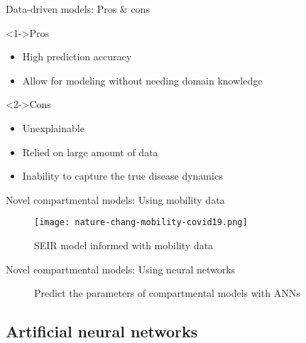 \begin{frame}{Data-driven models: Pros \& cons}
    \begin{exampleblock}<1->{Pros}
    \begin{itemize}
        \item High prediction accuracy
        \item Allow for modeling without needing domain knowledge
    \end{itemize}
    \end{exampleblock}

    \begin{alertblock}<2->{Cons}
    \begin{itemize}
        \item Unexplainable
        \item Relied on large amount of data
        \item Inability to capture the true disease dynamics
    \end{itemize}
    \end{alertblock}
\end{frame}

\begin{frame}{Novel compartmental models: Using mobility data}
    \begin{figure}[!htb]
        \centering
        \texttt{[image: nature-chang-mobility-covid19.png]}
        \caption{\gls{SEIR} model informed with mobility data \cite{changMobilityNetworkModels2021}}
        \label{fig:nature-chang-mobility-covid19}
    \end{figure}
\end{frame}

\begin{frame}{Novel compartmental models: Using neural networks}
    \begin{figure}[!htb]
        \centering
        \caption{Predict the parameters of compartmental models with \glspl{ANN}}
        \label{fig:compartmentals-models-with-neural-networks}
    \end{figure}
\end{frame}

\subsection{Artificial neural networks}

